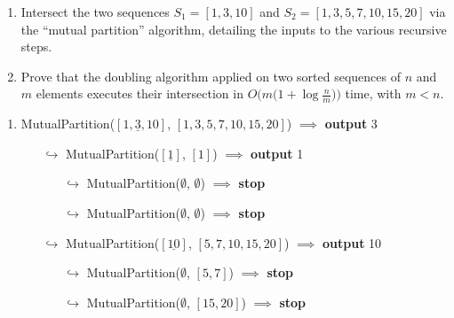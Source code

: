 \exercise

\begin{enumerate}

  \item Intersect the two sequences $S_1 = [1, 3, 10]$ and $S_2 = [1, 3, 5, 7,
  10, 15, 20]$ via the ``mutual partition'' algorithm, detailing the inputs to
  the various recursive steps.

  \item Prove that the doubling algorithm applied on two sorted sequences of $n$
  and $m$ elements executes their intersection in $O\big(m \big(1 + \log
  \frac{n}{m}\big)\big)$ time, with $m < n$.

\end{enumerate}

\solution

\begin{enumerate}
  \item {\sc MutualPartition($[1, \underline{3}, 10]$, $[1, 3, 5, 7, 10, 15, 20]$)} $\implies$ {\bf output} 3
    \begin{itemize}[topsep=-0.1em]
      \item[$\hookrightarrow$] {\sc MutualPartition($[\underline{1}]$, $[1]$)} $\implies$ {\bf output} 1
        \begin{itemize}
          \item[$\hookrightarrow$] {\sc MutualPartition($\emptyset$, $\emptyset$)} $\implies$ {\bf stop}
          \item[$\hookrightarrow$] {\sc MutualPartition($\emptyset$, $\emptyset$)} $\implies$ {\bf stop}
        \end{itemize}
      \item[$\hookrightarrow$] {\sc MutualPartition($[\underline{10}]$, $[5, 7, 10, 15, 20]$)} $\implies$ {\bf output} 10
        \begin{itemize}
          \item[$\hookrightarrow$] {\sc MutualPartition($\emptyset$, $[5, 7]$)} $\implies$ {\bf stop}
          \item[$\hookrightarrow$] {\sc MutualPartition($\emptyset$, $[15, 20]$)} $\implies$ {\bf stop}
        \end{itemize}
    \end{itemize}


\end{enumerate}
